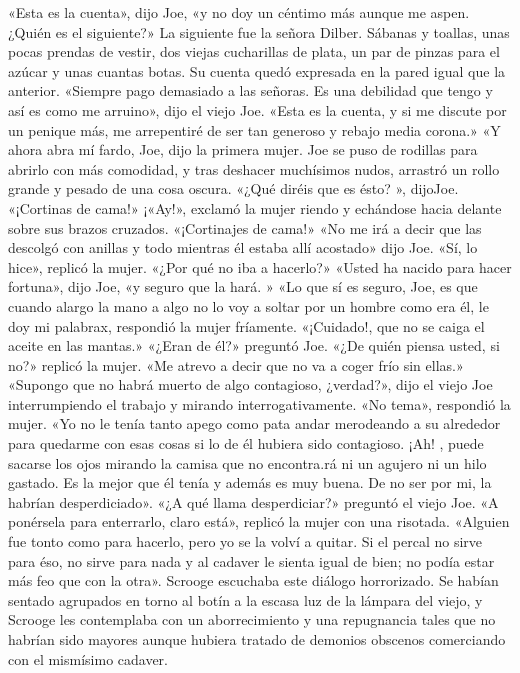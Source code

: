 \documentclass{novela}
\begin{document}
 «Esta es la cuenta», dijo Joe, «y no doy un céntimo más aunque me aspen. ¿Quién es el siguiente?»
 La siguiente fue la señora Dilber. Sábanas y toallas, unas pocas prendas de vestir, dos viejas cucharillas de plata, un par de pinzas para el azúcar y unas cuantas botas. Su cuenta quedó expresada en la pared igual que la anterior.
 «Siempre pago demasiado a las señoras. Es una debilidad que tengo y así es como me arruino», dijo el viejo Joe. «Esta es la cuenta, y si me discute por un penique más, me arrepentiré de ser tan generoso y rebajo media corona.»
 «Y ahora abra mí fardo, Joe, dijo la primera mujer.
 Joe se puso de rodillas para abrirlo con más comodidad, y tras deshacer muchísimos nudos, arrastró un rollo grande y pesado de una cosa oscura.
 «¿Qué diréis que es ésto? », dijoJoe. «¡Cortinas de cama!»
 ¡«Ay!», exclamó la mujer riendo y echándose hacia delante sobre sus brazos cruzados. «¡Cortinajes de cama!»
 «No me irá a decir que las descolgó con anillas y todo mientras él estaba allí acostado» dijo Joe.
 «Sí, lo hice», replicó la mujer. «¿Por qué no iba a hacerlo?»
 «Usted ha nacido para hacer fortuna», dijo Joe, «y seguro que la hará. »
 «Lo que sí es seguro, Joe, es que cuando alargo la mano a algo no lo voy a soltar por un hombre como era él, le doy mi palabrax, respondió la mujer fríamente. «¡Cuidado!, que no se caiga el aceite en las mantas.»
 «¿Eran de él?» preguntó Joe.
 «¿De quién piensa usted, si no?» replicó la mujer. «Me atrevo a decir que no va a coger frío sin ellas.»
 «Supongo que no habrá muerto de algo contagioso, ¿verdad?», dijo el viejo Joe interrumpiendo el trabajo y mirando interrogativamente.
 «No tema», respondió la mujer. «Yo no le tenía tanto apego como pata andar merodeando a su alrededor para quedarme con esas cosas si lo de él hubiera sido contagioso. ¡Ah! , puede sacarse los ojos mirando la camisa que no encontra.rá ni un agujero ni un hilo gastado. Es la mejor que él tenía y además es muy buena. De no ser por mi, la habrían desperdiciado».
 «¿A qué llama desperdiciar?» preguntó el viejo Joe.
 «A ponérsela para enterrarlo, claro está», replicó la mujer con una risotada. «Alguien fue tonto como para hacerlo, pero yo se la volví a quitar. Si el percal no sirve para éso, no sirve para nada y al cadaver le sienta igual de bien; no podía estar más feo que con la otra».
 Scrooge escuchaba este diálogo horrorizado. Se habían sentado agrupados en torno al botín a la escasa luz de la lámpara del viejo, y Scrooge les contemplaba con un aborrecimiento y una repugnancia tales que no habrían sido mayores aunque hubiera tratado de demonios obscenos comerciando con el mismísimo cadaver.
\end{document}
